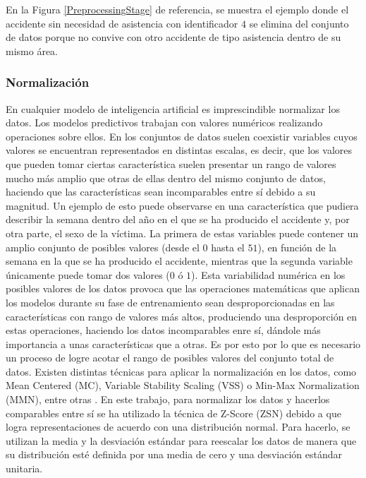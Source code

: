 \documentclass{uathesis-es}
\begin{document}
En la Figura \ref{PreprocessingStage} de referencia, se muestra el ejemplo donde el accidente sin necesidad de asistencia con identificador $4$ se elimina del conjunto de datos porque no convive con otro accidente de tipo asistencia dentro de su mismo área.


\subsubsection{Normalización}

En cualquier modelo de inteligencia artificial es imprescindible normalizar los datos. Los modelos predictivos trabajan con valores numéricos realizando operaciones sobre ellos. En los conjuntos de datos suelen coexistir variables cuyos valores se encuentran representados en distintas escalas, es decir, que los valores que pueden tomar ciertas característica suelen presentar un rango de valores mucho más amplio que otras de ellas dentro del mismo conjunto de datos, haciendo que las características sean incomparables entre sí debido a su magnitud. Un ejemplo de esto puede observarse en una característica que pudiera describir la semana dentro del año en el que se ha producido el accidente y, por otra parte, el sexo de la víctima. La primera de estas variables puede contener un amplio conjunto de posibles valores (desde el $0$ hasta el $51$), en función de la semana en la que se ha producido el accidente, mientras que la segunda variable únicamente puede tomar dos valores ($0$ ó $1$). Esta variabilidad numérica en los posibles valores de los datos provoca que las operaciones matemáticas que aplican los modelos durante su fase de entrenamiento sean desproporcionadas en las características con rango de valores más altos, produciendo una desproporción en estas operaciones, haciendo los datos incomparables enre sí, dándole más importancia a unas características que a otras. Es por esto por lo que es necesario un proceso de logre acotar el rango de posibles valores del conjunto total de datos. Existen distintas técnicas para aplicar la normalización en los datos, como Mean Centered (MC), Variable Stability Scaling (VSS) o Min-Max Normalization (MMN), entre otras \cite{DataNormalizationInvestigation}. En este trabajo, para normalizar los datos y hacerlos comparables entre sí se ha utilizado la técnica de Z-Score (ZSN) debido a que logra representaciones de acuerdo con una distribución normal. Para hacerlo, se utilizan la media y la desviación estándar para reescalar los datos de manera que su distribución esté definida por una media de cero y una desviación estándar unitaria.
\end{document}
